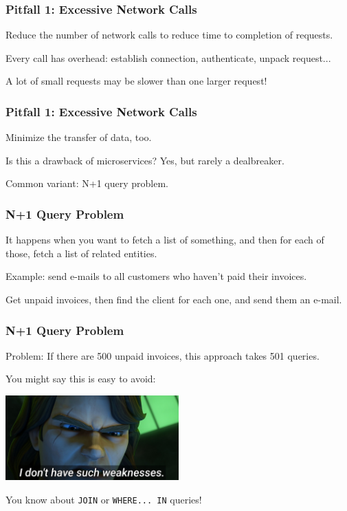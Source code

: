 \begin{frame}
\frametitle{Pitfall 1: Excessive Network Calls}
Reduce the number of network calls to reduce time to completion of requests.

Every call has overhead: establish connection, authenticate, unpack request...

A lot of small requests may be slower than one larger request!

\end{frame}

\begin{frame}
\frametitle{Pitfall 1: Excessive Network Calls}

Minimize the transfer of data, too.

Is this a drawback of microservices? Yes, but rarely a dealbreaker.

Common variant: N+1 query problem.

\end{frame}

\begin{frame}
\frametitle{N+1 Query Problem}

It happens when you want to fetch a list of something, and then for each of those, fetch a list of related entities.

Example: send e-mails to all customers who haven't paid their invoices.

Get unpaid invoices, then find the client for each one, and send them an e-mail.

\end{frame}

\begin{frame}
\frametitle{N+1 Query Problem}
Problem: If there are 500 unpaid invoices, this approach takes 501 queries.

You might say this is easy to avoid:
\begin{center}
	\includegraphics[width=0.5\textwidth]{images/weaknesses.jpg}
\end{center}

You know about \texttt{JOIN} or \texttt{WHERE... IN} queries!

\end{frame}


